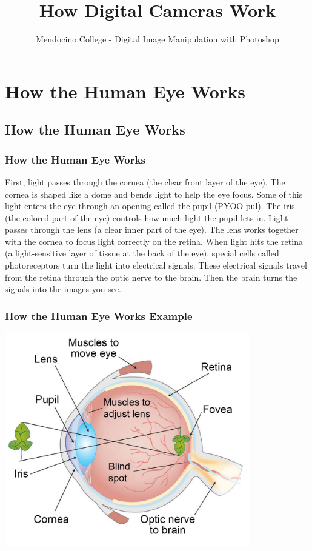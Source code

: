 \documentclass{beamer}
\title{How Digital Cameras Work}
\author{Mendocino College - Digital Image Manipulation with Photoshop}
\date{\vspace{-5em}}
\begin{document}
	{
		\begin{frame}
			\vspace{-35pt}
			\maketitle
		\end{frame}
	}
		
\section{How the Human Eye Works}

\subsection{How the Human Eye Works}		

\begin{frame}
	\frametitle{How the Human Eye Works}
	\begin{outline}
		\1 First, light passes through the cornea (the clear front layer of the eye). 
		\2 The cornea is shaped like a dome and bends light to help the eye focus.
		\1 Some of this light enters the eye through an opening called the pupil (PYOO-pul). 
		\2 The iris (the colored part of the eye) controls how much light the pupil lets in.
		\1 Light passes through the lens (a clear inner part of the eye). 
		\2 The lens works together with the cornea to focus light correctly on the retina.
		\1 When light hits the retina (a light-sensitive layer of tissue at the back of the eye), special cells called \2 photoreceptors turn the light into electrical signals.
		\1 These electrical signals travel from the retina through the optic nerve to the brain. 
		\2 Then the brain turns the signals into the images you see.
	\end{outline}
\end{frame}

\begin{frame}
	\frametitle{How the Human Eye Works Example}
	\begin{center}
		\includegraphics[width=0.8\textwidth]{images/eye-anatomy-1000.jpg}
	\end{center}
\end{frame}
\end{document}
